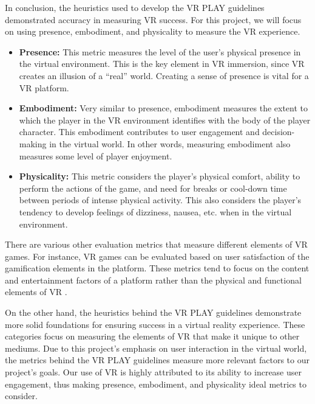 \documentclass[10pt,twocolumn]{article}
\begin{document}
\par In conclusion, the heuristics used to develop the VR PLAY guidelines demonstrated accuracy in measuring VR success. For this project, we will focus on using presence, embodiment, and physicality to measure the VR experience. 

\begin{itemize}
    \item \textbf{Presence:} This metric measures the level of the user's physical presence in the virtual environment. This is the key element in VR immersion, since VR creates an illusion of a “real” world. Creating a sense of presence is vital for a VR platform.
    \item \textbf{Embodiment:} Very similar to presence, embodiment measures the extent to which the player in the VR environment identifies with the body of the player character. This embodiment contributes to user engagement and decision-making in the virtual world. In other words, measuring embodiment also measures some level of player enjoyment. 
    \item \textbf{Physicality:} This metric considers the player's physical comfort, ability to perform the actions of the game, and need for breaks or cool-down time between periods of intense physical activity. This also considers the player's tendency to develop feelings of dizziness, nausea, etc. when in the virtual environment. 
\end{itemize}

\par There are various other evaluation metrics that measure different elements of VR games. For instance, VR games can be evaluated based on user satisfaction of the gamification elements in the platform. These metrics tend to focus on the content and entertainment factors of a platform rather than the physical and functional elements of VR \cite{Desurvire2018DesignUserExperience}. 

\par On the other hand, the heuristics behind the VR PLAY guidelines demonstrate more solid foundations for ensuring success in a virtual reality experience. These categories focus on measuring the elements of VR that make it unique to other mediums. Due to this project’s emphasis on user interaction in the virtual world, the metrics behind the VR PLAY guidelines measure more relevant factors to our project's goals. Our use of VR is highly attributed to its ability to increase user engagement, thus making presence, embodiment, and physicality ideal metrics to consider. 
\end{document}
